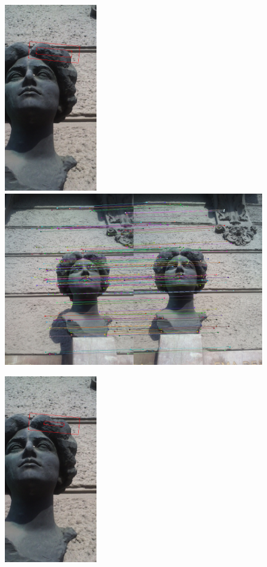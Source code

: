 \begin{figure}[h]
\centerline{
\includegraphics[width=4.0cm]{img/rectangle_w_02_h_035_croped.png}
\includegraphics[width=12.1cm]{img/matching_w_02_h_035.png}}
\centerline{
\includegraphics[width=4.0cm]{img/rectangle_w_01__h_02_croped.png}
}
\end{figure}
